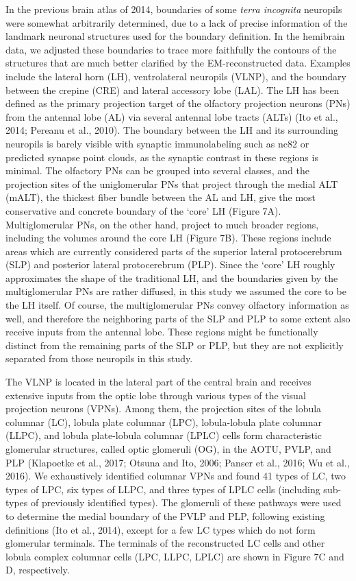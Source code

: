 \documentclass{article}
\begin{document}
In the previous brain atlas of 2014, boundaries of some \emph{terra incognita} neuropils were somewhat arbitrarily determined, due to a lack of precise information of the landmark neuronal structures used for the boundary definition. In the hemibrain data, we adjusted these boundaries to trace more faithfully the contours of the structures that are much better clarified by the EM-reconstructed data. Examples include the lateral horn (LH), ventrolateral neuropils (VLNP), and the boundary between the crepine (CRE) and lateral accessory lobe (LAL). The LH has been defined as the primary projection target of the olfactory projection neurons (PNs) from the antennal lobe (AL) via several antennal lobe tracts (ALTs) (Ito et al., 2014; Pereanu et al., 2010). The boundary between the LH and its surrounding neuropils is barely visible with synaptic immunolabeling such as nc82 or predicted synapse point clouds, as the synaptic contrast in these regions is minimal. The olfactory PNs can be grouped into several classes, and the projection sites of the uniglomerular PNs that project through the medial ALT (mALT), the thickest fiber bundle between the AL and LH, give the most conservative and concrete boundary of the ‘core’ LH (Figure 7A). Multiglomerular PNs, on the other hand, project to much broader regions, including the volumes around the core LH (Figure 7B). These regions include areas which are currently considered parts of the superior lateral protocerebrum (SLP) and posterior lateral protocerebrum (PLP). Since the ‘core’ LH roughly approximates the shape of the traditional LH, and the boundaries given by the multiglomerular PNs are rather diffused, in this study we assumed the core to be the LH itself. Of course, the multiglomerular PNs convey olfactory information as well, and therefore the neighboring parts of the SLP and PLP to some extent also receive inputs from the antennal lobe. These regions might be functionally distinct from the remaining parts of the SLP or PLP, but they are not explicitly separated from those neuropils in this study.

The VLNP is located in the lateral part of the central brain and receives extensive inputs from the optic lobe through various types of the visual projection neurons (VPNs). Among them, the projection sites of the lobula columnar (LC), lobula plate columnar (LPC), lobula-lobula plate columnar (LLPC), and lobula plate-lobula columnar (LPLC) cells form characteristic glomerular structures, called optic glomeruli (OG), in the AOTU, PVLP, and PLP (Klapoetke et al., 2017; Otsuna and Ito, 2006; Panser et al., 2016; Wu et al., 2016). We exhaustively identified columnar VPNs and found 41 types of LC, two types of LPC, six types of LLPC, and three types of LPLC cells (including sub-types of previously identified types). The glomeruli of these pathways were used to determine the medial boundary of the PVLP and PLP, following existing definitions (Ito et al., 2014), except for a few LC types which do not form glomerular terminals. The terminals of the reconstructed LC cells and other lobula complex columnar cells (LPC, LLPC, LPLC) are shown in Figure 7C and D, respectively.
\end{document}
